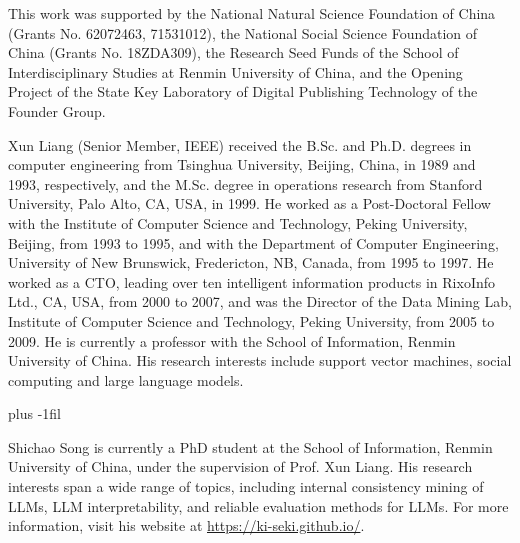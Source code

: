 \documentclass[lettersize,journal]{IEEEtran}
\begin{document}
\noindent This work was supported by the National Natural Science Foundation of China (Grants No. 62072463, 71531012), the National Social Science Foundation of China (Grants No. 18ZDA309), the Research Seed Funds of the School of Interdisciplinary Studies at Renmin University of China, and the Opening Project of the State Key Laboratory of Digital Publishing Technology of the Founder Group.



{\appendices

}






\begin{IEEEbiography}{Xun Liang}
(Senior Member, IEEE) received the B.Sc. and Ph.D. degrees in computer engineering from Tsinghua University, Beijing, China, in 1989 and 1993, respectively, and the M.Sc. degree in operations research from Stanford University, Palo Alto, CA, USA, in 1999. He worked as a Post-Doctoral Fellow with the Institute of Computer Science and Technology, Peking University, Beijing, from 1993 to 1995, and with the Department of Computer Engineering, University of New Brunswick, Fredericton, NB, Canada, from 1995 to 1997. He worked as a CTO, leading over ten intelligent information products in RixoInfo Ltd., CA, USA, from 2000 to 2007, and was the Director of the Data Mining Lab, Institute of Computer Science and Technology, Peking University, from 2005 to 2009. He is currently a professor with the School of Information, Renmin University of China. His research interests include support vector machines, social computing and large language models.
\end{IEEEbiography}

\baselineskip plus -1fil

\begin{IEEEbiography}{Shichao Song}
is currently a PhD student at the School of Information, Renmin University of China, under the supervision of Prof. Xun Liang. His research interests span a wide range of topics, including internal consistency mining of LLMs, LLM interpretability, and reliable evaluation methods for LLMs. For more information, visit his website at \url{https://ki-seki.github.io/}.
\end{IEEEbiography}
\end{document}
